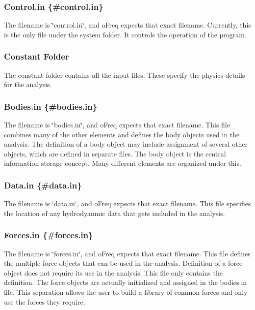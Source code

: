 \subsubsection*{Control.\-in \{\#control.\-in\}}

The filename is \char`\"{}control.\-in\char`\"{}, and o\-Freq expects that exact filename. Currently, this is the only file under the system folder. It controls the operation of the program.\hypertarget{directory_structure_constant1}{}\subsubsection{Constant Folder}\label{directory_structure_constant1}
The constant folder contains all the input files. These specify the physics details for the analysis.

\subsubsection*{Bodies.\-in \{\#bodies.\-in\}}

The filename is \char`\"{}bodies.\-in\char`\"{}, and o\-Freq expects that exact filename. This file combines many of the other elements and defines the body objects used in the analysis. The definition of a body object may include assignment of several other objects, which are defined in separate files. The body object is the central information storage concept. Many different elements are organized under this.

\subsubsection*{Data.\-in \{\#data.\-in\}}

The filename is \char`\"{}data.\-in\char`\"{}, and o\-Freq expects that exact filename. This file specifies the location of any hydrodyanmic data that gets included in the analysis.

\subsubsection*{Forces.\-in \{\#forces.\-in\}}

The filename is \char`\"{}forces.\-in\char`\"{}, and o\-Freq expects that exact filename. This file defines the multiple force objects that can be used in the analysis. Definition of a force object does not require its use in the analysis. This file only contains the definition. The force objects are actually initialized and assigned in the bodies.\-in file. This separation allows the user to build a library of common forces and only use the forces they require.

